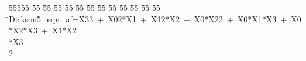 %
%
\begin{tabbing}
55555 \= 55 \= 55 \= 55 \= 55 \= 55 \= 55 \= 55 \= 55 \= 55 \= 55 \= 55 \= 55 \= \>Dickson5\_eqn\_af=X33\ +\ X02*X1\ +\ X12*X2\ +\ X0*X22\ +\ X0*X1*X3\ +\ X0*X2*X3\ +\ X1*X2\\[0pt]
\>*X3\\[0pt]
2\>\end{tabbing}
